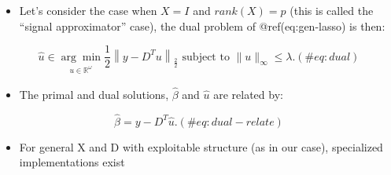 \documentclass[
  ignorenonframetext,
]{beamer}
\providecommand{\tightlist}{%
  \setlength{\itemsep}{0pt}\setlength{\parskip}{0pt}}
\begin{document}
\begin{frame}{}
\protect\hypertarget{section}{}
\begin{itemize}
\tightlist
\item
  Let's consider the case when \(X=I\) and \(rank(X)=p\) (this is called
  the ``signal approximator'' case), the dual problem of
  @ref(eq:gen-lasso) is then:
\end{itemize}

\begin{equation}
\hat{u} \in \underset{\substack{u \in \mathbb{R}^{\omega}}}{\arg \min } \frac{1}{2}\left\|y-D^{T} u\right\|_{\frac{2}{2}} \text { subject to }\|u\|_{\infty} \leq \lambda.
(\#eq:dual)
\end{equation}

\begin{itemize}
\tightlist
\item
  The primal and dual solutions, \(\hat{\beta}\) and \(\hat{u}\) are
  related by:
\end{itemize}

\begin{equation}
\hat{\beta}=y-D^{T} \hat{u} .
(\#eq:dual-relate)
\end{equation}

\begin{itemize}
\tightlist
\item
  For general X and D with exploitable structure (as in our case),
  specialized implementations exist
\end{itemize}
\end{frame}
\end{document}
